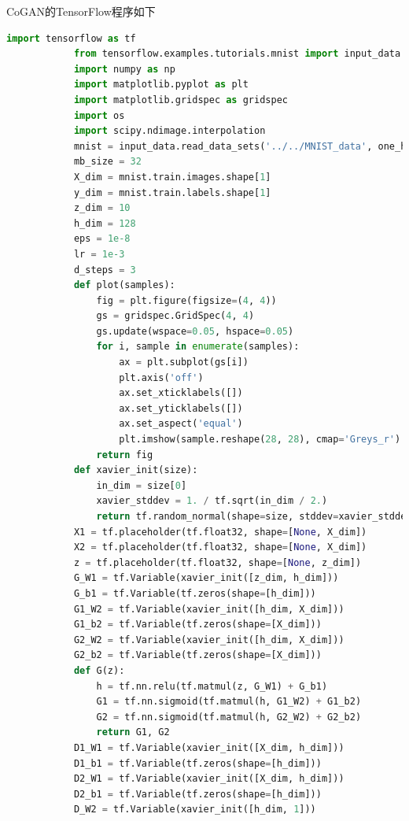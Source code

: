             \par
            CoGAN的TensorFlow程序如下
            \begin{lstlisting}[language = Python]
            import tensorflow as tf
            from tensorflow.examples.tutorials.mnist import input_data
            import numpy as np
            import matplotlib.pyplot as plt
            import matplotlib.gridspec as gridspec
            import os
            import scipy.ndimage.interpolation
            mnist = input_data.read_data_sets('../../MNIST_data', one_hot=True)
            mb_size = 32
            X_dim = mnist.train.images.shape[1]
            y_dim = mnist.train.labels.shape[1]
            z_dim = 10
            h_dim = 128
            eps = 1e-8
            lr = 1e-3
            d_steps = 3
            def plot(samples):
                fig = plt.figure(figsize=(4, 4))
                gs = gridspec.GridSpec(4, 4)
                gs.update(wspace=0.05, hspace=0.05)
                for i, sample in enumerate(samples):
                    ax = plt.subplot(gs[i])
                    plt.axis('off')
                    ax.set_xticklabels([])
                    ax.set_yticklabels([])
                    ax.set_aspect('equal')
                    plt.imshow(sample.reshape(28, 28), cmap='Greys_r')
                return fig
            def xavier_init(size):
                in_dim = size[0]
                xavier_stddev = 1. / tf.sqrt(in_dim / 2.)
                return tf.random_normal(shape=size, stddev=xavier_stddev)
            X1 = tf.placeholder(tf.float32, shape=[None, X_dim])
            X2 = tf.placeholder(tf.float32, shape=[None, X_dim])
            z = tf.placeholder(tf.float32, shape=[None, z_dim])
            G_W1 = tf.Variable(xavier_init([z_dim, h_dim]))
            G_b1 = tf.Variable(tf.zeros(shape=[h_dim]))
            G1_W2 = tf.Variable(xavier_init([h_dim, X_dim]))
            G1_b2 = tf.Variable(tf.zeros(shape=[X_dim]))
            G2_W2 = tf.Variable(xavier_init([h_dim, X_dim]))
            G2_b2 = tf.Variable(tf.zeros(shape=[X_dim]))
            def G(z):
                h = tf.nn.relu(tf.matmul(z, G_W1) + G_b1)
                G1 = tf.nn.sigmoid(tf.matmul(h, G1_W2) + G1_b2)
                G2 = tf.nn.sigmoid(tf.matmul(h, G2_W2) + G2_b2)
                return G1, G2
            D1_W1 = tf.Variable(xavier_init([X_dim, h_dim]))
            D1_b1 = tf.Variable(tf.zeros(shape=[h_dim]))
            D2_W1 = tf.Variable(xavier_init([X_dim, h_dim]))
            D2_b1 = tf.Variable(tf.zeros(shape=[h_dim]))
            D_W2 = tf.Variable(xavier_init([h_dim, 1]))

\end{lstlisting}
